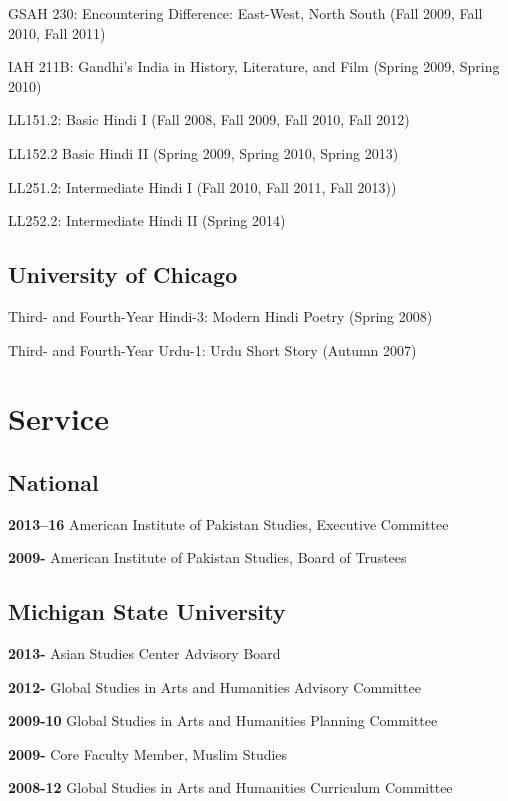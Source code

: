 \documentclass[letterpaper,12pt]{article}
\begin{document}
GSAH 230: Encountering Difference: East-West, North South (Fall 2009, Fall 2010, Fall 2011)

IAH 211B: Gandhi’s India in History, Literature, and Film (Spring 2009, Spring 2010)

LL151.2: Basic Hindi I (Fall 2008, Fall 2009, Fall 2010, Fall 2012)

LL152.2 Basic Hindi II (Spring 2009, Spring 2010, Spring 2013)

LL251.2: Intermediate Hindi I (Fall 2010, Fall 2011, Fall 2013))

LL252.2: Intermediate Hindi II (Spring 2014)


\subsection{University of Chicago%
  \label{university-of-chicago}%
}

Third- and Fourth-Year Hindi-3: Modern Hindi Poetry (Spring 2008)

Third- and Fourth-Year Urdu-1: Urdu Short Story (Autumn 2007)


\section{Service%
  \label{service}%
}


\subsection{National%
  \label{national}%
}

\textbf{2013–16}
American Institute of Pakistan Studies, Executive Committee

\textbf{2009-}
American Institute of Pakistan Studies, Board of Trustees


\subsection{Michigan State University%
  \label{id2}%
}

\textbf{2013-}
Asian Studies Center Advisory Board

\textbf{2012-}
Global Studies in Arts and Humanities Advisory Committee

\textbf{2009-10}
Global Studies in Arts and Humanities Planning Committee

\textbf{2009-}
Core Faculty Member, Muslim Studies

\textbf{2008-12}
Global Studies in Arts and Humanities Curriculum Committee
\end{document}
